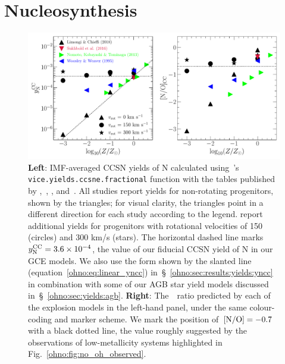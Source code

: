 
\section{Nucleosynthesis}
\label{ohno:sec:yields}

\begin{figure}
\centering
\includegraphics[scale = 0.65]{n_cc_yields.pdf}
\caption{
\textbf{Left}: IMF-averaged CCSN yields of N calculated using~\vice's
\texttt{vice.yields.ccsne.fractional} function with the tables published by
\citet[][blue]{Woosley1995},~\citet[][green]{Nomoto2013},
\citet[][red]{Sukhbold2016}, and~\citet[][black]{Limongi2018}.
All studies report yields for non-rotating progenitors, shown by the triangles;
for visual clarity, the triangles point in a different direction for each study
according to the legend.
\citet{Limongi2018} report additional yields for progenitors with rotational
velocities of 150 (circles) and 300 km/s (stars).
The horizontal dashed line marks~$y_\text{N}^\text{CC} = 3.6\times10^{-4}$,
the value of our fiducial CCSN yield of N in our GCE models.
We also use the form shown by the slanted line (equation~\ref{ohno:eq:linear_yncc})
in~\S~\ref{ohno:sec:results:yields:yncc} in combination with some of our AGB star
yield models discussed in~\S~\ref{ohno:sec:yields:agb}.
\textbf{Right}: The~\no~ratio predicted by each of the explosion models in
the left-hand panel, under the same colour-coding and marker scheme.
We mark the position of~$\text{[N/O]} = -0.7$ with a black dotted line, the value
roughly suggested by the observations of low-metallicity systems highlighted
in Fig.~\ref{ohno:fig:no_oh_observed}.
}
\label{ohno:fig:n_cc_yields}
\end{figure}

